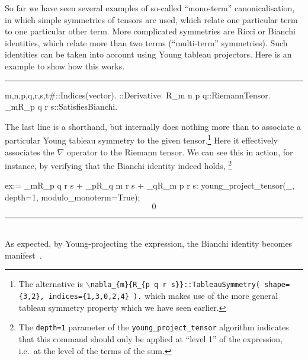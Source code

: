 \documentclass[11pt]{article}
\newenvironment{hanging}
    {\begin{list}{}{\setlength\itemsep{0pt}%
 \setlength\topsep{0pt}%
 \setlength\leftmargin{25pt}%
 \setlength\itemindent{0pt}%
 \setlength\listparindent{\itemindent}}%
     \item[]}
    {\end{list}}
\newcommand{\toprule}{\par\vspace{1ex}\noindent\hspace{25pt}\rule{435pt}{.1pt}}
\newcommand{\botrule}{\noindent\hspace{25pt}\rule{435pt}{.1pt}\\[2ex]}
\newenvironment{cdbin}{\fvset{firstnumber=1}\color[named]{Blue}\Verbatim}{\endVerbatim}
\newenvironment{cdbcont}{\fvset{firstnumber=last}\color[named]{Blue}\Verbatim}{\endVerbatim}
\newenvironment{cdbout}{\vspace{-1ex}\begin{equation}}{\end{equation}\vspace{-1ex}}
\newenvironment{cdbcom}{\begin{hanging}}{\end{hanging}}
\begin{document}
So far we have seen several examples of so-called ``mono-term''
canonicalisation, in which simple symmetries of tensors are used,
which relate one particular term to one particular other term. More
complicated symmetries are Ricci or Bianchi identities, which relate
more than two terms (``multi-term'' symmetries). Such identities can
be taken into account using Young tableau projectors. Here is an
example to show how this works.  
\toprule
\begin{cdbin}
{m,n,p,q,r,s,t#}::Indices(vector).
\nabla{#}::Derivative.
R_{m n p q}::RiemannTensor.
\nabla_{m}{R_{p q r s}}::SatisfiesBianchi.
\end{cdbin}
\begin{cdbcom}
The last line is a shorthand, but internally does nothing more than to
associate a particular Young tableau symmetry to the given
tensor.\footnote{The alternative is
{\tt $\backslash$nabla\_\{m\}\{R\_\{p q r s\}\}::TableauSymmetry( shape=\{3,2\}, indices=\{1,3,0,2,4\} ).} 
which makes use of the more general tableau symmetry property which we
have seen earlier.} Here it effectively associates the $\nabla$
operator to the Riemann tensor. We can see this in action, for
instance, by verifying that the Bianchi identity indeed holds,
\footnote{The {\tt depth=1} parameter of the
  {\tt young\_project\_tensor} algorithm indicates that this command
  should only be applied at ``level 1'' of the expression, i.e.~at the
  level of the terms of the sum.}
\end{cdbcom}
\begin{cdbcont}
ex:= \nabla_{m}{R_{p q r s}} + \nabla_{p}{R_{q m r s}} + \nabla_{q}{R_{m p r s}}:
young_project_tensor(_, depth=1, modulo_monoterm=True);
\end{cdbcont}
\begin{cdbout}
0
\end{cdbout}
\botrule
As expected, by Young-projecting the expression, the Bianchi identity
becomes manifest~\cite{Green:2005qr}.
\end{document}
